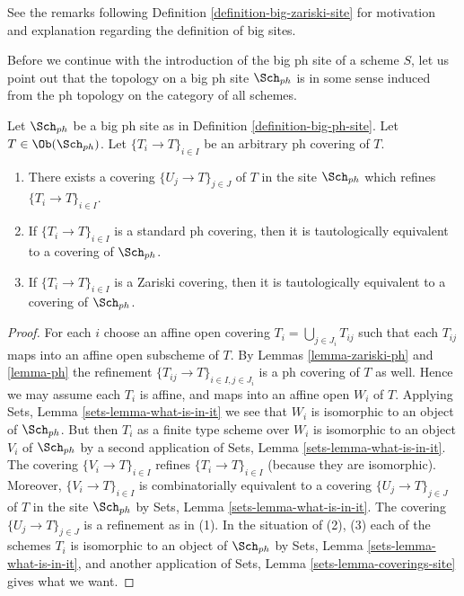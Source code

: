 \noindent
See the remarks following Definition \ref{definition-big-zariski-site}
for motivation and explanation regarding the definition of big sites.

\medskip\noindent
Before we continue with the introduction of the big ph site of
a scheme $S$, let us point out that the topology on a big ph site
$\Sch_{ph}$ is in some sense induced from the ph topology
on the category of all schemes.

\begin{lemma}
\label{lemma-ph-induced}
Let $\Sch_{ph}$ be a big ph site as in
Definition \ref{definition-big-ph-site}.
Let $T \in \Ob(\Sch_{ph})$.
Let $\{T_i \to T\}_{i \in I}$ be an arbitrary ph covering of $T$.
\begin{enumerate}
\item There exists a covering $\{U_j \to T\}_{j \in J}$ of $T$ in the site
$\Sch_{ph}$ which refines $\{T_i \to T\}_{i \in I}$.
\item If $\{T_i \to T\}_{i \in I}$ is a standard ph covering, then
it is tautologically equivalent to a covering of $\Sch_{ph}$.
\item If $\{T_i \to T\}_{i \in I}$ is a Zariski covering, then
it is tautologically equivalent to a covering of $\Sch_{ph}$.
\end{enumerate}
\end{lemma}

\begin{proof}
For each $i$ choose an affine open covering $T_i = \bigcup_{j \in J_i} T_{ij}$
such that each $T_{ij}$ maps into an affine open subscheme of $T$. By
Lemmas \ref{lemma-zariski-ph} and \ref{lemma-ph}
the refinement $\{T_{ij} \to T\}_{i \in I, j \in J_i}$ is a ph covering
of $T$ as well. Hence we may assume each $T_i$ is affine, and maps into
an affine open $W_i$ of $T$. Applying
Sets, Lemma \ref{sets-lemma-what-is-in-it}
we see that $W_i$ is isomorphic to an object of $\Sch_{ph}$.
But then $T_i$ as a finite type scheme over $W_i$
is isomorphic to an object $V_i$ of $\Sch_{ph}$ by a second
application of
Sets, Lemma \ref{sets-lemma-what-is-in-it}.
The covering $\{V_i \to T\}_{i \in I}$ refines $\{T_i \to T\}_{i \in I}$
(because they are isomorphic).
Moreover, $\{V_i \to T\}_{i \in I}$ is combinatorially equivalent to a
covering $\{U_j \to T\}_{j \in J}$ of $T$ in the site
$\Sch_{ph}$ by
Sets, Lemma \ref{sets-lemma-what-is-in-it}.
The covering $\{U_j \to T\}_{j \in J}$ is a refinement as in (1).
In the situation of (2), (3) each of the
schemes $T_i$ is isomorphic to an object of $\Sch_{ph}$ by
Sets, Lemma \ref{sets-lemma-what-is-in-it},
and another application of
Sets, Lemma \ref{sets-lemma-coverings-site}
gives what we want.
\end{proof}

